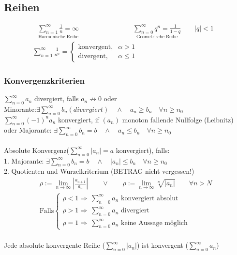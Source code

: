 \documentclass[6pt,a4paper]{scrartcl}
\newcommand{\abs}[1]{\ensuremath{\left\vert#1\right\vert}}
\newcommand{\Ra}[0]{\ensuremath{\Rightarrow}}
\begin{document}
\begin{multicols*}{4}
\subsection{Reihen}
\begin{eqnarray*}
	\underset{\text{Harmonische Reihe}}{\sum_{n=1}^\infty \frac{1}{n} = \infty} \qquad \qquad  \qquad \qquad \underset{\text{Geometrische Reihe}}{\sum_{n=0}^\infty q^n = \frac{1}{1-q}} \qquad |q|<1
\end{eqnarray*}
\begin{eqnarray*}
	\sum_{n=1}^\infty \frac{1}{n^\alpha} = \begin{cases} \text{konvergent}, & \alpha > 1 \\ \text{divergent}, & \alpha \le 1 \end{cases} \qquad \qquad \qquad \qquad \qquad \qquad
\end{eqnarray*}



\subsubsection{Konvergenzkriterien}
$\sum^{\infty}_{n = 0} a_n$ divergiert, falls $a_n \not \rightarrow 0$ oder\\
Minorante:$\exists \sum^{\infty}_{n = 0} b_n (divergiert) \quad \land \quad a_n \ge b_n \quad \forall n\ge n_0$\\[0.6em] 
$\sum^{\infty}_{n = 0}(-1)^n a_n$ konvergiert, if $(a_n)$ monoton fallende Nullfolge (Leibnitz)\\
oder Majorante: $\exists \sum^{\infty}_{n = 0} b_n = b \quad \land \quad a_n \le b_n \quad \forall n\ge n_0$\\
\\
Absolute Konvergenz($\sum^\infty_{n=0} |a_n|=a$ konvergiert), falls:\\
1. Majorante: $\exists \sum^{\infty}_{n = 0} b_n = b \quad \land \quad |a_n| \le b_n \quad \forall n\ge n_0$\\
2. Quotienten und Wurzelkriterium (BETRAG nicht vergessen!)
\begin{eqnarray*}
	\rho := \lim_{n \rightarrow \infty} \abs{\frac{a_{n+1}}{a_n}} \qquad \lor \qquad \rho := \lim_{n \rightarrow \infty} \sqrt[n]{\abs{a_n}} \qquad \forall n > N\\
	\text{Falls} 
	\begin{cases}
		\rho < 1 \Ra  ~\sum^\infty_{n=0} a_n \text{ konvergiert absolut} \\
		\rho > 1 \Ra  ~\sum^\infty_{n=0} a_n \text{ divergiert} \\
		\rho = 1 \Ra  ~\sum^\infty_{n=0} a_n \text{ keine Aussage möglich}
	\end{cases}
\end{eqnarray*}
\\
Jede absolute konvergente Reihe ($\sum^\infty_{n=0} |a_n|$) ist konvergent ($\sum^\infty_{n=0} a_n$)



\end{multicols*}
\end{document}
